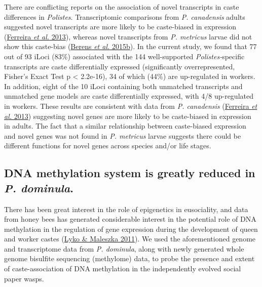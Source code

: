 There are conflicting reports on the association of novel transcripts in
caste differences in \textit{Polistes}. Transcriptomic comparisons from
\textit{P. canadensis} adults suggested novel transcripts are more likely
to be caste-biased in expression
(\protect\hyperlink{ux5fENREFux5f10}{Ferreira \textit{et al.} 2013}),
whereas novel transcripts from \textit{P. metricus} larvae did not show
this caste-bias (\protect\hyperlink{ux5fENREFux5f3}{Berens \textit{et al.}
2015b}). In the current study, we found that 77 out of 93 iLoci (83\%)
associated with the 144 well-supported \textit{Polistes-}specific
transcripts are caste differentially expressed (significantly
overrepresented, Fisher's Exact Test p \textless{} 2.2e-16), 34 of which
(44\%) are up-regulated in workers. In addition, eight of the 10 iLoci
containing both unmatched transcripts and unmatched gene models are
caste differentially expressed, with 4/8 up-regulated in workers. These
results are consistent with data from \textit{P. canadensis}
(\protect\hyperlink{ux5fENREFux5f10}{Ferreira \textit{et al.} 2013})
suggesting novel genes are more likely to be caste-biased in expression
in adults. The fact that a similar relationship between caste-biased
expression and novel genes was not found in \textit{P. metricus} larvae
suggests there could be different functions for novel genes across
species and/or life stages.

\subsection{DNA methylation system is greatly reduced in \textit{P.
dominula}.} There has been great interest in the role of epigenetics in
eusociality, and data from honey bees has generated considerable
interest in the potential role of DNA methylation in the regulation of
gene expression during the development of queen and worker castes
(\protect\hyperlink{ux5fENREFux5f34}{Lyko \& Maleszka 2011}). We used
the aforementioned genome and transcriptome data from \textit{P.
dominula}, along with newly generated whole genome bisulfite sequencing
(methylome) data, to probe the presence and extent of caste-association
of DNA methylation in the independently evolved social paper wasps.

